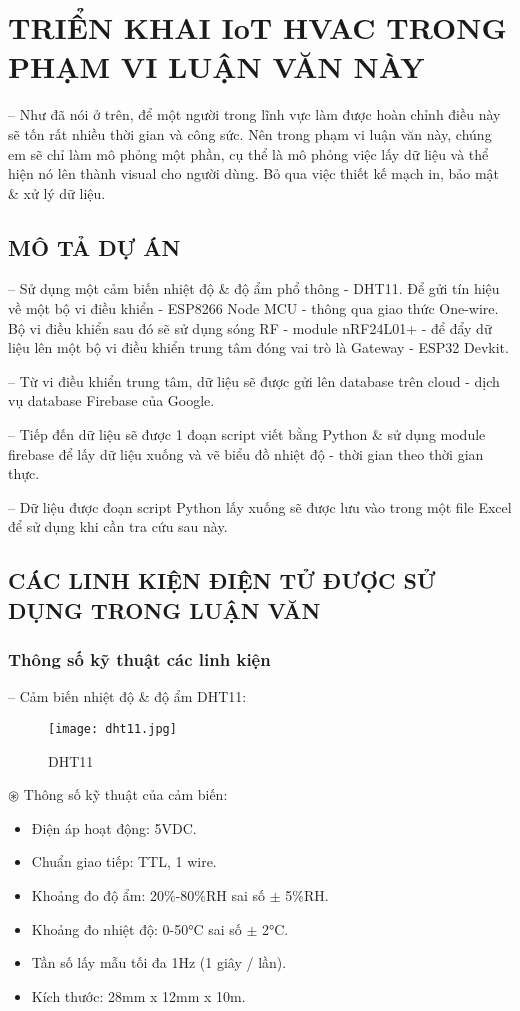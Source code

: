 \section{TRIỂN KHAI IoT HVAC TRONG PHẠM VI LUẬN VĂN NÀY}
-- Như đã nói ở trên, để một người trong lĩnh vực làm được hoàn chỉnh điều này sẽ tốn rất nhiều thời gian và công sức. Nên trong phạm vi luận văn này, chúng em sẽ chỉ làm mô phỏng một phần, cụ thể là mô phỏng việc lấy dữ liệu và thể hiện nó lên thành visual cho người dùng. Bỏ qua việc thiết kế mạch in, bảo mật \& xử lý dữ liệu. 

\subsection{MÔ TẢ DỰ ÁN}
-- Sử dụng một cảm biến nhiệt độ \& độ ẩm phổ thông - DHT11. Để gửi tín hiệu về một bộ vi điều khiển - ESP8266 Node MCU - thông qua giao thức One-wire. Bộ vi điều khiển sau đó sẽ sử dụng sóng RF - module nRF24L01+ - để đẩy dữ liệu lên một bộ vi điều khiển trung tâm đóng vai trò là Gateway - ESP32 Devkit.

-- Từ vi điều khiển trung tâm, dữ liệu sẽ được gửi lên database trên cloud - dịch vụ database Firebase của Google.

-- Tiếp đến dữ liệu sẽ được 1 đoạn script viết bằng Python \& sử dụng module firebase để lấy dữ liệu xuống và vẽ biểu đồ nhiệt độ - thời gian theo thời gian thực.

-- Dữ liệu được đoạn script Python lấy xuống sẽ được lưu vào trong một file Excel để sử dụng khi cần tra cứu sau này.

\subsection{CÁC LINH KIỆN ĐIỆN TỬ ĐƯỢC SỬ DỤNG TRONG LUẬN VĂN}
\subsubsection{Thông số kỹ thuật các linh kiện}
-- Cảm biến nhiệt độ \& độ ẩm DHT11:
\begin{figure}[H]
	\centering
	\texttt{[image: dht11.jpg]}
	\caption{DHT11}
\end{figure}

$\circledast$ Thông số kỹ thuật của cảm biến:
\begin{itemize}
	\item Điện áp hoạt động: 5VDC.
	\item Chuẩn giao tiếp: TTL, 1 wire.
	\item Khoảng đo độ ẩm: 20\%-80\%RH sai số $ \pm $ 5\%RH.
	\item Khoảng đo nhiệt độ: 0-50°C sai số $ \pm $ 2°C.
	\item Tần số lấy mẫu tối đa 1Hz (1 giây / lần).
	\item Kích thước: 28mm x 12mm x 10m.
\end{itemize}

